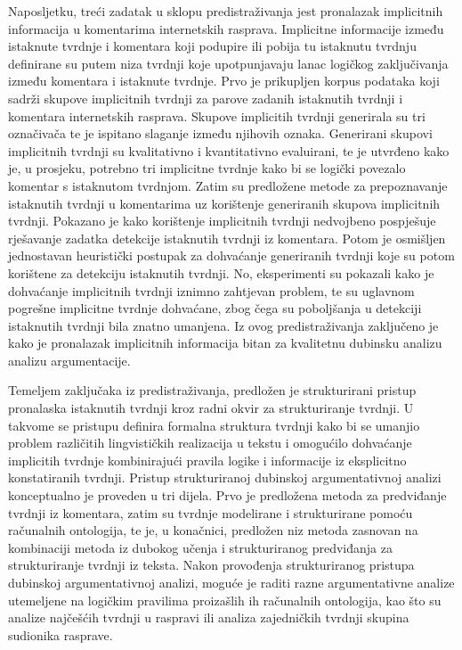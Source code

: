 Naposljetku, treći zadatak u sklopu predistraživanja jest 
pronalazak implicitnih informacija u komentarima internetskih rasprava. 
Implicitne informacije između istaknute tvrdnje i komentara koji podupire ili pobija
tu istaknutu tvrdnju definirane su putem niza tvrdnji koje upotpunjavaju 
lanac logičkog zaključivanja između komentara i istaknute tvrdnje. 
Prvo je prikupljen korpus podataka koji sadrži skupove implicitnih tvrdnji za
parove zadanih istaknutih tvrdnji i komentara internetskih rasprava. 
Skupove implicitih tvrdnji generirala su tri označivača te je ispitano slaganje
između njihovih oznaka. Generirani skupovi implicitnih tvrdnji su
kvalitativno i kvantitativno evaluirani, te je utvrđeno kako je, 
u prosjeku, potrebno tri implicitne tvrdnje kako bi se logički povezalo
komentar s istaknutom tvrdnjom. 
Zatim su predložene metode za prepoznavanje istaknutih 
tvrdnji u komentarima uz korištenje generiranih skupova implicitnih tvrdnji. 
Pokazano je kako korištenje implicitnih tvrdnji nedvojbeno pospješuje 
rješavanje zadatka detekcije istaknutih tvrdnji iz komentara. 
Potom je osmišljen jednostavan heuristički postupak za dohvaćanje generiranih 
tvrdnji koje su potom
korištene za detekciju istaknutih tvrdnji. No, eksperimenti su pokazali kako je 
dohvaćanje implicitnih tvrdnji iznimno zahtjevan problem, te su uglavnom pogrešne
implicitne tvrdnje dohvaćane, zbog čega su poboljšanja u detekciji istaknutih tvrdnji 
bila znatno umanjena. 
Iz ovog predistraživanja zaključeno je kako je pronalazak implicitnih informacija
bitan za kvalitetnu dubinsku analizu analizu argumentacije. 

Temeljem zaključaka iz predistraživanja, predložen je strukturirani pristup
pronalaska istaknutih tvrdnji kroz radni okvir za strukturiranje tvrdnji.  U
takvome se pristupu definira formalna struktura tvrdnji kako bi se umanjio
problem različitih lingvističkih realizacija u tekstu i omogućilo dohvaćanje
implicitih tvrdnje kombinirajući pravila logike i informacije iz eksplicitno
konstatiranih tvrdnji.  Pristup strukturiranoj dubinskoj argumentativnoj
analizi konceptualno je proveden u tri dijela.  Prvo je predložena metoda za
predviđanje tvrdnji iz komentara, zatim su tvrdnje modelirane i strukturirane
pomoću računalnih ontologija, te je, u konačnici, predložen niz metoda zasnovan
na kombinaciji metoda iz dubokog učenja i strukturiranog predviđanja 
za strukturiranje tvrdnji iz teksta. Nakon
provođenja strukturiranog pristupa dubinskoj argumentativnoj analizi, moguće je
raditi razne argumentativne analize utemeljene na logičkim pravilima proizašlih ih računalnih
ontologija, kao što su analize najčešćih tvrdnji u raspravi ili analiza
zajedničkih tvrdnji skupina sudionika rasprave. 

